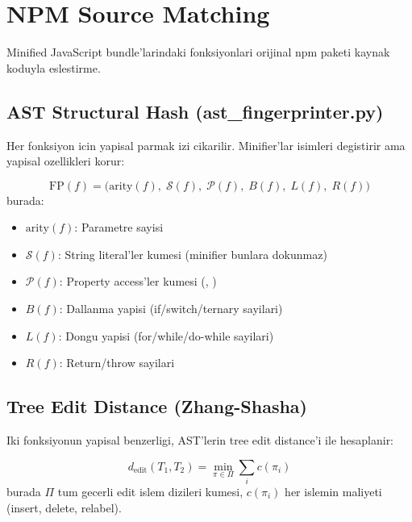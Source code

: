\section{NPM Source Matching}
\label{sec:npm-source-matching}

Minified JavaScript bundle'larindaki fonksiyonlari orijinal npm paketi
kaynak koduyla eslestirme.

\subsection{AST Structural Hash (ast\_fingerprinter.py)}

Her fonksiyon icin yapisal parmak izi cikarilir. Minifier'lar isimleri
degistirir ama yapisal ozellikleri korur:

\begin{equation}
  \text{FP}(f) = \bigl(\text{arity}(f),\; \mathcal{S}(f),\; \mathcal{P}(f),\;
    B(f),\; L(f),\; R(f)\bigr)
  \label{eq:function-fingerprint}
\end{equation}
burada:
\begin{itemize}
  \item $\text{arity}(f)$: Parametre sayisi
  \item $\mathcal{S}(f)$: String literal'ler kumesi (minifier bunlara dokunmaz)
  \item $\mathcal{P}(f)$: Property access'ler kumesi (, )
  \item $B(f)$: Dallanma yapisi (if/switch/ternary sayilari)
  \item $L(f)$: Dongu yapisi (for/while/do-while sayilari)
  \item $R(f)$: Return/throw sayilari
\end{itemize}

\subsection{Tree Edit Distance (Zhang-Shasha)}

Iki fonksiyonun yapisal benzerligi, AST'lerin tree edit distance'i
ile hesaplanir:

\begin{equation}
  d_{\text{edit}}(T_1, T_2) = \min_{\pi \in \Pi} \sum_{i} c(\pi_i)
  \label{eq:tree-edit-distance}
\end{equation}
burada $\Pi$ tum gecerli edit islem dizileri kumesi,
$c(\pi_i)$ her islemin maliyeti (insert, delete, relabel).


